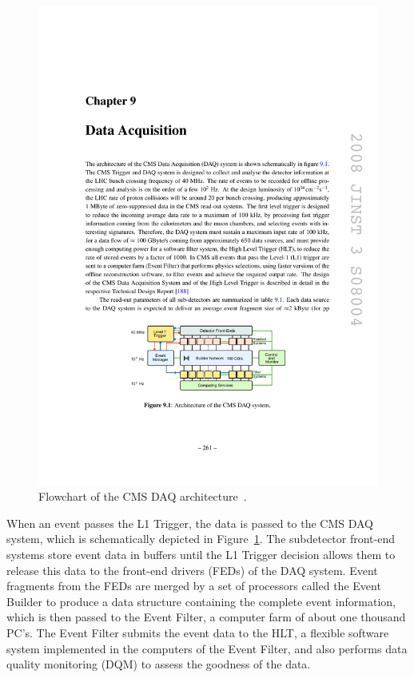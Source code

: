 \begin{figure}[hbtp]
  \begin{center}
    \includegraphics[width=1.5\cmsFigWidth]{figures/cms-DAQflowchart}
    \caption{Flowchart of the CMS DAQ architecture~\cite{1748-0221-3-08-S08004}.}
    \label{fig:cms-DAQflowchart}
  \end{center}
\end{figure}

When an event passes the L1 Trigger, the data is passed to the CMS DAQ system, which is schematically depicted in Figure~\ref{fig:cms-DAQflowchart}. The subdetector front-end systems store event data in buffers until the L1 Trigger decision allows them to release this data to the front-end drivers (FEDs) of the DAQ system. Event fragments from the FEDs are merged by a set of processors called the Event Builder to produce a data structure containing the complete event information, which is then passed to the Event Filter, a computer farm of about one thousand PC's. The Event Filter submits the event data to the HLT, a flexible software system implemented in the computers of the Event Filter, and also performs data quality monitoring (DQM) to assess the goodness of the data.

